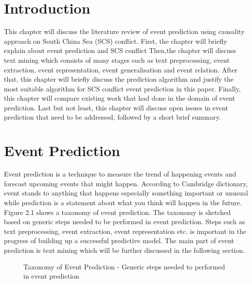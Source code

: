 \documentclass[twoside]{utmthesis}
\begin{document}
\section{Introduction}
This chapter will discuss the literature review of event prediction using causality approach on South China Sea (SCS) conflict. First, the chapter will briefly explain about event prediction and SCS conflict Then,the chapter will discuss text mining which consists of many stages such as text preprocessing, event extraction, event representation, event generalisation and event relation. After that, this chapter will briefly discuss the prediction algorithm and justify the most suitable algorithm for SCS conflict event prediction in this paper. Finally, this chapter will compare existing work that had done in the domain of event prediction. Last but not least, this chapter will discuss  open issues in event prediction that need to be addressed, followed by a short brief summary.  


\section{Event Prediction}
Event prediction is a technique to measure the trend of happening events and forecast upcoming events that might happen. According to Cambridge dictionary, event stands to anything that happens especially something important or unusual while prediction is a statement about what you think will happen in the future. Figure 2.1 shows a taxonomy of event prediction. The taxonomy is sketched based on generic steps needed to be performed in event prediction. Steps such as text preprocessing, event extraction, event representation etc. is important in the progress of building up a successful predictive model. The main part of event prediction is text mining which will be further discussed in the following section.  

\begin{figure}[H]
\centering
{}
\caption{Taxonomy of Event Prediction - Generic steps needed to performed in event prediction}
\end{figure}  
\vspace{-1cm}
 
\end{document}
